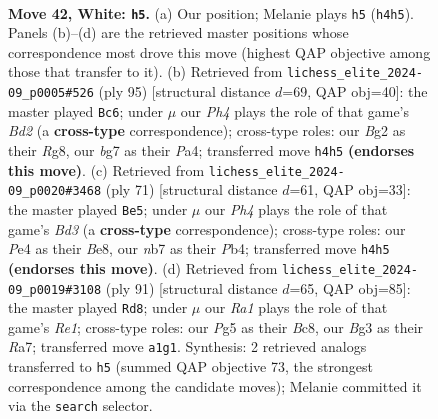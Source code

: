 \documentclass[11pt]{article}
\begin{document}
\clearpage

\begin{figure}[p]\centering
\begin{subfigure}{0.46\textwidth}\centering
\resizebox{\linewidth}{!}{%
\newchessgame
\chessboard[
  setfen={1rr5/1n3kbp/p2p2p1/P3p1P1/1pP1P2P/1P3PBR/2K3B1/R7 w - - 1 42},
  showmover=false,
  pgfstyle=straightmove, color=movearrow, markmove={h4-h5}
]}
\caption{}
\end{subfigure}\hfill
\begin{subfigure}{0.46\textwidth}\centering
\resizebox{\linewidth}{!}{%
\newchessgame
\chessboard[
  setfen={4r1r1/2kb1p2/4p1p1/1p1pP2p/pP3P2/P1PR2P1/4B2P/2K4R b - - 36 48},
  showmover=false,
  pgfstyle=straightmove, color=movearrow, markmove={d7-c6}
]}
\caption{}
\end{subfigure}
\\[4pt]
\begin{subfigure}{0.46\textwidth}\centering
\resizebox{\linewidth}{!}{%
\newchessgame
\chessboard[
  setfen={r3b3/rp3p2/3b1k2/P2P1p2/1p5p/1N3PpP/1P4P1/R2R1B1K b - - 3 36},
  showmover=false,
  pgfstyle=straightmove, color=movearrow, markmove={d6-e5}
]}
\caption{}
\end{subfigure}\hfill
\begin{subfigure}{0.46\textwidth}\centering
\resizebox{\linewidth}{!}{%
\newchessgame
\chessboard[
  setfen={2b1r2k/r5p1/1p3pPp/1P1p4/P1pPpP2/2N1P3/5KP1/2R4R b - - 0 46},
  showmover=false,
  pgfstyle=straightmove, color=movearrow, markmove={e8-d8}
]}
\caption{}
\end{subfigure}
\caption{\textbf{Move 42, White: \texttt{h5}.} (a) Our position; Melanie plays \texttt{h5} (\texttt{h4h5}). Panels (b)--(d) are the retrieved master positions whose correspondence most drove this move (highest QAP objective among those that transfer to it). (b) Retrieved from \texttt{lichess\_elite\_2024-09\_p0005\#526} (ply 95) [structural distance $d$=69, QAP obj=40]: the master played \texttt{Bc6}; under $\mu$ our \emph{Ph4} plays the role of that game's \emph{Bd2} (a \textbf{cross-type} correspondence); cross-type roles: our \emph{B}g2 as their \emph{R}g8, our \emph{b}g7 as their \emph{P}a4; transferred move \texttt{h4h5} \textbf{(endorses this move)}. (c) Retrieved from \texttt{lichess\_elite\_2024-09\_p0020\#3468} (ply 71) [structural distance $d$=61, QAP obj=33]: the master played \texttt{Be5}; under $\mu$ our \emph{Ph4} plays the role of that game's \emph{Bd3} (a \textbf{cross-type} correspondence); cross-type roles: our \emph{P}e4 as their \emph{B}e8, our \emph{n}b7 as their \emph{P}b4; transferred move \texttt{h4h5} \textbf{(endorses this move)}. (d) Retrieved from \texttt{lichess\_elite\_2024-09\_p0019\#3108} (ply 91) [structural distance $d$=65, QAP obj=85]: the master played \texttt{Rd8}; under $\mu$ our \emph{Ra1} plays the role of that game's \emph{Re1}; cross-type roles: our \emph{P}g5 as their \emph{B}c8, our \emph{B}g3 as their \emph{R}a7; transferred move \texttt{a1g1}. Synthesis: 2 retrieved analogs transferred to \texttt{h5} (summed QAP objective 73, the strongest correspondence among the candidate moves); Melanie committed it via the \texttt{search} selector.}
\label{fig:thought-m82}
\end{figure}
\end{document}
